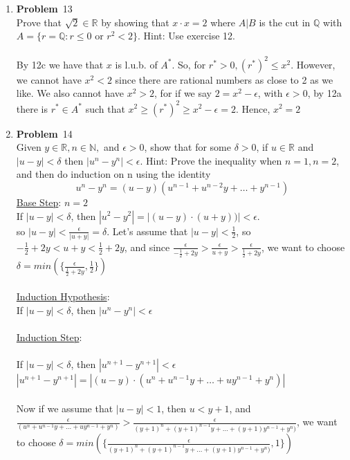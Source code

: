 \documentclass[12pt]{amsart}
\theoremstyle{definition}
\newcommand{\mbR}{\mathbb{R}}
\newcommand{\mbN}{\mathbb{N}}
\newcommand{\mbQ}{\mathbb{Q}}
\newcommand{\itep}{\item {\bfseries Problem}\ }
\begin{document}
\begin{enumerate}[series=p]
\newpage
\itep 13\\
Prove that $\sqrt{2} \in \mbR$ by showing that $x \cdot x = 2$ where $A|B$ is the cut in $\mbQ$ with $A = \{r = \mbQ: r \leq 0 \text{ or } r^2 < 2\}$.  Hint: Use exercise 12.
\\\\
By 12c we have that $x$ is l.u.b. of $A^*$.  So, for $r^* > 0, (r^*)^2 \leq x^2$.  However, we cannot have $x^2 < 2$ since there are rational numbers as close to 2 as we like.  We also cannot have $x^2 > 2$, for if we say $2 = x^2 - \epsilon$, with $\epsilon > 0$, by 12a there is $r^* \in A^*$ such that $x^2 \geq (r^*)^2 \geq x^2 - \epsilon = 2$.  Hence, $x^2 = 2$


\newpage
\itep 14\\
Given $y \in \mbR, n \in \mbN,$ and $\epsilon > 0$, show that for some $\delta > 0$, if $u \in \mbR$ and $|u-y| < \delta$ then $|u^n - y^n| < \epsilon$.  Hint: Prove the inequality when $n = 1, n = 2$, and then do induction on n using the identity
$$u^n - y^n = (u-y)(u^{n-1} + u^{n-2}y + \dots + y^{n-1})$$
\underline{Base Step}: $n = 2$
\\
If $|u - y| < \delta$, then $|u^2 - y^2| = |(u - y) \cdot (u + y))| < \epsilon$.\\ so $|u -y | < \frac{\epsilon}{|u + y|} = \delta$.  Let's assume that $|u - y | < \frac{1}{2}$, so $-\frac{1}{2}+2y < u+y < \frac{1}{2} + 2y$, and since $\frac{\epsilon}{-\frac{1}{2} + 2y} > \frac{\epsilon}{u + y} > \frac{\epsilon}{\frac{1}{2} + 2y}$, we want to choose $\delta = min(\{\frac{\epsilon}{\frac{1}{2}+2y}, \frac{1}{2}\})$
\\\\
\underline{Induction Hypothesis}:
\\
If $|u - y| < \delta$, then $|u^n - y^n| < \epsilon$
\\\\
\underline{Induction Step}:
\\
\\
If $|u-y| < \delta$, then $|u^{n+1} - y^{n+1}| < \epsilon$\\
$|u^{n+1} - y^{n+1}| = |(u - y)\cdot(u^n + u^{n-1}y + \dots + uy^{n-1} + y^n)|$\\
\\
Now if we assume that $|u - y | < 1$, then $u < y + 1$, and $\frac{\epsilon}{(u^n + u^{n-1}y + \dots + uy^{n-1} + y^n)} > \frac{\epsilon}{(y+1)^n + (y+1)^{n-1}y + \dots + (y+1)y^{n-1} + y^n)}$, we want to choose $\delta = min(\{\frac{\epsilon}{(y+1)^n + (y+1)^{n-1}y + \dots + (y+1)y^{n-1} + y^n)}, 1\})$


\end{enumerate}
\end{document}
